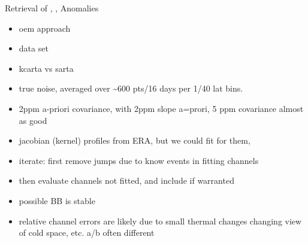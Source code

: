 \documentclass[10pt,t]{beamer}
\begin{document}
\begin{frame}[label={sec:orgdef18f4}]{Retrieval of \cd, \nitrous, \methane Anomalies}
\begin{itemize}
\item oem approach
\item data set
\item kcarta vs sarta
\item true noise, averaged over \textasciitilde{}600 pts/16 days per 1/40 lat bins.
\item 2ppm \cd a-priori covariance, with 2ppm slope a=prori, 5 ppm covariance almost as good
\item jacobian (kernel) profiles from ERA, but we could fit for them,
\item iterate: first remove jumps due to know events in fitting channels
\item then evaluate channels not fitted, and include if warranted
\item possible  BB is stable
\item relative channel errors are likely due to small thermal changes changing view of cold space, etc.  a/b often different
\end{itemize}
\end{frame}
\end{document}
